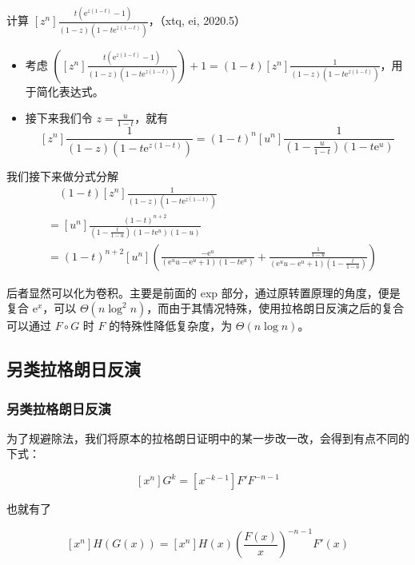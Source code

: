 \documentclass[mathserif]{ctexbeamer}
\newcommand{\me}{\mathrm{e}}
\begin{document}
\frame
{
  \begin{example}
  
  计算 $[z^n]\frac{t(\me^{z(1-t)}-1)}{(1-z)(1-t\me^{z(1-t)})}$，（xtq, ei, 2020.5）
  \end{example}
  
}

\frame
{
  \begin{solution}
  \begin{itemize}
  \item<1-> 考虑 $\left([z^n]\frac{t(\mathrm e^{z(1-t)}-1)}{(1-z) (1-t \mathrm e^{z(1-t)})}\right) + 1 = (1-t)[z^n] \frac 1{(1-z)(1-t\mathrm e^{z(1-t)})}$，用于简化表达式。
  \item<2-> 接下来我们令 $z = \frac u{1-t}$，就有
$$
[z^n]\frac 1{(1-z)(1-t\mathrm e^{z(1-t)})} = (1-t)^n[u^n] \frac1{(1-\frac u{1-t})(1-t\mathrm{e}^u)}
$$
  \end{itemize}
  \end{solution}
}

\frame
{
  我们接下来做分式分解
$$
\begin{aligned} &\quad (1-t)[z^n] \frac 1{(1-z)(1-t\mathrm e^{z(1-t)})}\\
 &= [u^n]\frac{(1-t)^{n+2}}{(1-\frac{t}{1-u})(1-t\mathrm e^u)(1-u)}\\
 &= (1-t)^{n+2} [u^n] \left(\frac{-\mathrm e^u}{\left(\mathrm e^u u-\mathrm e^u+1\right) \left(1-t \mathrm e^u\right)}+\frac{\frac{1}{1-u}}{\left(\mathrm e^u   u-\mathrm e^u+1\right) (1-\frac{t}{1-u})}\right)\end{aligned}
$$
}

\frame
{
  后者显然可以化为卷积。主要是前面的 exp 部分，通过原转置原理的角度，便是复合 $\mathrm{e}^x$，可以 $\Theta(n\log^2 n)$，而由于其情况特殊，使用拉格朗日反演之后的复合可以通过 $F \circ G$ 时 $F$ 的特殊性降低复杂度，为 $\Theta(n\log n)$。
}

\subsection{另类拉格朗日反演}
\frame
{
  \frametitle{另类拉格朗日反演}
  为了规避除法，我们将原本的拉格朗日证明中的某一步改一改，会得到有点不同的下式：
  
  $$
  [x^n]G^k= [x^{-k-1}]F'F^{-n-1}
  $$
  
  也就有了
  
  $$
  [x^n] H(G(x)) = [x^n] H(x) \left(\frac{F(x)}x\right)^{-n-1}F'(x)
  $$
}
\end{document}
